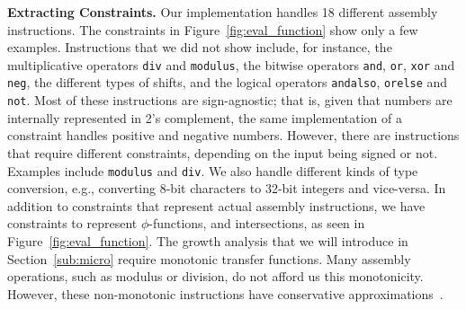 \documentclass[preprint]{elsarticle}
\begin{document}


\noindent
\textbf{Extracting Constraints.}
Our implementation handles 18 different assembly instructions.
The constraints in Figure~\ref{fig:eval_function} show only a few examples.
Instructions that we did not show include, for instance, the multiplicative
operators \texttt{div} and \texttt{modulus},
the bitwise operators \texttt{and}, \texttt{or}, \texttt{xor} and \texttt{neg},
the different types of shifts, and the
logical operators \texttt{andalso}, \texttt{orelse} and \texttt{not}.
Most of these instructions are sign-agnostic; that is, given that numbers are
internally represented in 2's complement, the same implementation of a
constraint handles positive and negative numbers.
However, there are instructions that require different constraints, depending on
the input being signed or not.
Examples include \texttt{modulus} and \texttt{div}.
We also handle different kinds of type conversion, e.g., converting 8-bit
characters to 32-bit integers and vice-versa.
In addition to constraints that represent actual assembly instructions, we have
constraints to represent $\phi$-functions, and intersections, as seen in
Figure~\ref{fig:eval_function}.
The growth analysis that we will introduce in Section~\ref{sub:micro}
require monotonic transfer functions.
Many assembly operations, such as modulus or division, do not afford us
this monotonicity.
However, these non-monotonic instructions have conservative
approximations~\cite{Warren02}.
\end{document}
